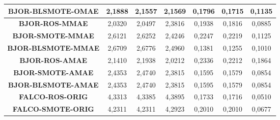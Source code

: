 \begin{table}[H]
{\begin{tabular}{|ccccccc|}
\multicolumn{1}{|c|}{\textbf{BJOR-BLSMOTE-OMAE}}  & \multicolumn{1}{c|}{2,1888}           & \multicolumn{1}{c|}{2,1557}             & \multicolumn{1}{c|}{2,1569}          & \multicolumn{1}{c|}{0,1796}            & \multicolumn{1}{c|}{0,1715}             & 0,1135       \\ \hline
\multicolumn{1}{|c|}{\textbf{BJOR-ROS-MMAE}}      & \multicolumn{1}{c|}{2,0320}          & \multicolumn{1}{c|}{2,0497}            & \multicolumn{1}{c|}{2,3816}         & \multicolumn{1}{c|}{0,1938}           & \multicolumn{1}{c|}{0,1816}             & 0,0885       \\ \hline
\multicolumn{1}{|c|}{\textbf{BJOR-SMOTE-MMAE}}    & \multicolumn{1}{c|}{2,6121}           & \multicolumn{1}{c|}{2,6252}             & \multicolumn{1}{c|}{2,4246}          & \multicolumn{1}{c|}{0,2247}           & \multicolumn{1}{c|}{0,2219}             & 0,1125        \\ \hline
\multicolumn{1}{|c|}{\textbf{BJOR-BLSMOTE-MMAE}}  & \multicolumn{1}{c|}{2,6709}            & \multicolumn{1}{c|}{2,6776}             & \multicolumn{1}{c|}{2,4960}          & \multicolumn{1}{c|}{0,1381}           & \multicolumn{1}{c|}{0,1255}             & 0,1010       \\ \hline
\multicolumn{1}{|c|}{\textbf{BJOR-ROS-AMAE}}      & \multicolumn{1}{c|}{2,1410}           & \multicolumn{1}{c|}{2,1938}             & \multicolumn{1}{c|}{2,0212}          & \multicolumn{1}{c|}{0,2336}           & \multicolumn{1}{c|}{0,2212}             & 0,1864       \\ \hline
\multicolumn{1}{|c|}{\textbf{BJOR-SMOTE-AMAE}}    & \multicolumn{1}{c|}{2,4353}           & \multicolumn{1}{c|}{2,4740}             & \multicolumn{1}{c|}{2,3815}           & \multicolumn{1}{c|}{0,1595}           & \multicolumn{1}{c|}{0,1579}              & 0,0854       \\ \hline
\multicolumn{1}{|c|}{\textbf{BJOR-BLSMOTE-AMAE}}  & \multicolumn{1}{c|}{2,4353}           & \multicolumn{1}{c|}{2,4740}             & \multicolumn{1}{c|}{2,3815}           & \multicolumn{1}{c|}{0,1595}           & \multicolumn{1}{c|}{0,1579}              & 0,0854       \\ \hline
\multicolumn{1}{|c|}{\textbf{FALCO-ROS-ORIG}}     & \multicolumn{1}{c|}{4,3313}           & \multicolumn{1}{c|}{4,3385}             & \multicolumn{1}{c|}{4,3895}           & \multicolumn{1}{c|}{0,1733}           & \multicolumn{1}{c|}{0,1716}             & 0,0510       \\ \hline
\multicolumn{1}{|c|}{\textbf{FALCO-SMOTE-ORIG}}   & \multicolumn{1}{c|}{4,2311}           & \multicolumn{1}{c|}{4,2311}             & \multicolumn{1}{c|}{4,2923}          & \multicolumn{1}{c|}{0,2010}           & \multicolumn{1}{c|}{0,2010}             & 0,0677        \\ \hline

\end{tabular}}
\end{table}
